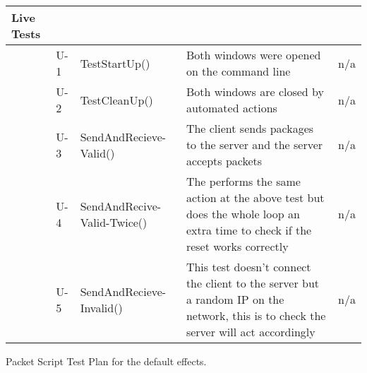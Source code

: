 \begin{longtable}{| p{1.5cm} | p{1.5cm} | p{4cm} | p{5cm} | p{3cm} |}
		Live Tests &&&& \\ \hline
		&U-1& TestStartUp() & Both windows were opened on the command line & n/a \\ \hline
		&U-2& TestCleanUp() & Both windows are closed by automated actions & n/a \\ \hline
		&U-3& SendAndRecieve-Valid() & The client sends packages to the server and the server accepts packets & n/a \\ \hline
		&U-4& SendAndRecive-Valid-Twice() & The performs the same action at the above test but does the whole loop an extra time to check if the reset works correctly & n/a \\ \hline
		&U-5& SendAndRecieve-Invalid() & This test doesn't connect the client to the server but a random IP on the network, this is to check the server will act accordingly & n/a \\ \hline
\end{longtable}

Packet Script Test Plan for the default effects.

